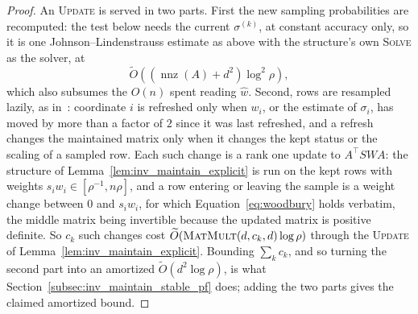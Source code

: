 \documentclass[11pt]{article}
\newcommand{\nnz}{\operatorname{nnz}}
\newcommand{\MM}{\textsc{MatMult}}
\renewcommand{\O}{\widetilde O}
\newcommand{\what}{\widehat{w}}
\begin{document}
\begin{proof}
An \textsc{Update} is served in two parts.
First the new sampling probabilities are recomputed: the test below needs the
current $\sigma^{(k)}$, at constant accuracy only, so it is one
Johnson--Lindenstrauss estimate as above with the structure's own \textsc{Solve}
as the solver, at
\[
\O\left( \left( \nnz(A) + d^{2} \right) \log^{2} \rho \right) ,
\]
which also subsumes the $O(n)$ spent reading
$\what$.
Second, rows are resampled lazily, as in~\cite[Algorithm 3]{LS15}:
coordinate $i$ is refreshed only when
$w_i$, or the estimate of
$\sigma_i$, has moved by more than a factor of
$2$ since it was last refreshed, and a refresh changes the maintained matrix
only when it changes the kept status or the scaling of a sampled row.
Each such change is a rank one update to $A^\top S W A$: the structure of
Lemma~\ref{lem:inv_maintain_explicit} is run on the kept rows with weights
$s_i w_i \in [\rho^{-1}, n \rho]$, and a row entering or leaving the sample is a
weight change between $0$ and
$s_i w_i$, for which Equation~\eqref{eq:woodbury} holds verbatim, the middle
matrix being invertible because the updated matrix is positive definite.
So $c_k$ such changes cost
$\O(\MM(d, c_k, d) \log \rho)$ through the \textsc{Update} of
Lemma~\ref{lem:inv_maintain_explicit}.
Bounding $\sum_k c_k$, and so turning the second part into an amortized
$\O(d^{2} \log \rho)$, is what Section~\ref{subsec:inv_maintain_stable_pf} does;
adding the two parts gives the claimed amortized bound.


\end{proof}
\end{document}
